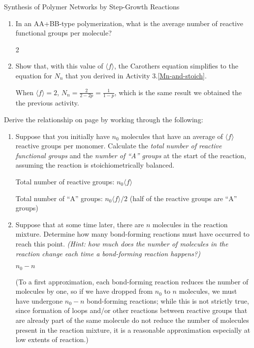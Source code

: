 \begin{activity}[extension]{Synthesis of Polymer Networks by Step-Growth Reactions}
\begin{exercises}
		\begin{enumerate}
			\item In an AA+BB-type polymerization, what is the average number of reactive functional groups per molecule?
			
				\begin{solution}{}
					2
				\end{solution}
			
			\item Show that, with this value of $\langle f\rangle$, the Carothers equation simplifies to the equation for $N_n$ that you derived in Activity 3.\ref{Mn-and-stoich}.
			
				\begin{solution}{}
					When $\langle f\rangle = 2$, $N_n = \frac{2}{2-2p} = \frac{1}{1-p}$, which is the same result we obtained the the previous activity.
				\end{solution}
		\end{enumerate}	
		
	\exercise \label{\labelbase:exc:Nn} Derive the relationship on page \pageref{\labelbase:eqn:carothers} by working through the following:
	
		\begin{enumerate}
			\item Suppose that you initially have $n_0$ molecules that have an average of $\langle f\rangle$ reactive groups per monomer.  				Calculate the \emph{total number of reactive functional groups} and the \emph{number of ``A'' groups} at the start of the reaction, assuming the reaction is stoichiometrically balanced.
			
			\begin{solution}{}
				Total number of reactive groups: $n_0 \langle f \rangle$
				
				Total number of ``A'' groups: $n_0 \langle f \rangle /2$ (half of the reactive groups are ``A'' groups)
			\end{solution}
			
			\item Suppose that at some time later, there are $n$ molecules in the reaction mixture.  Determine how many bond-forming reactions must have occurred to reach this point.  \emph{(Hint: how much does the number of molecules in the reaction change each time a bond-forming reaction happens?)}
			
				\begin{solution}{}
					$n_0 - n$ 
					
					(To a first approximation, each bond-forming reaction reduces the number of molecules by one, so if we have dropped from $n_0$ to $n$ molecules, we must have undergone $n_0-n$ bond-forming reactions; while this is not strictly true, since formation of loops and/or other reactions between reactive groups that are already part of the same molecule do not reduce the number of molecules present in the reaction mixture, it is a reasonable approximation especially at low extents of reaction.)
				\end{solution}
				

\end{enumerate}
\end{exercises}
\end{activity}
